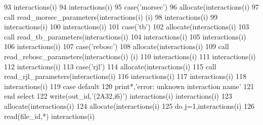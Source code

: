 \begin{DoxyCode}
{{{{{93             interactions(i)%
94             interactions(i)%
95         \textcolor{keywordflow}{case}(\textcolor{stringliteral}{'morsec'})
96             \textcolor{keyword}{allocate}(interactions(i)%
97             \textcolor{keyword}{call }read\_morsec\_parameters(interactions(i)%
      (i)%
98             interactions(i)%
99             interactions(i)%
100             interactions(i)%
101         \textcolor{keywordflow}{case}(\textcolor{stringliteral}{'tb'})
102             \textcolor{keyword}{allocate}(interactions(i)%
103             \textcolor{keyword}{call }read\_tb\_parameters(interactions(i)%
104             interactions(i)%
105             interactions(i)%
106             interactions(i)%
107         \textcolor{keywordflow}{case}(\textcolor{stringliteral}{'rebosc'})
108             \textcolor{keyword}{allocate}(interactions(i)%
109             \textcolor{keyword}{call }read\_rebosc\_parameters(interactions(i)%
      (i)%
110             interactions(i)%
111             interactions(i)%
112             interactions(i)%
113         \textcolor{keywordflow}{case}(\textcolor{stringliteral}{'rjl'})
114             \textcolor{keyword}{allocate}(interactions(i)%
115             \textcolor{keyword}{call }read\_rjl\_parameters(interactions(i)%
116             interactions(i)%
117             interactions(i)%
118             interactions(i)%
119 \textcolor{keywordflow}{        case default}
120             print*,\textcolor{stringliteral}{'error: unknown interaction name'}
121 \textcolor{keywordflow}{        end select}
122         \textcolor{keyword}{write}(out\_id,\textcolor{stringliteral}{'(2A32,i6)'}) interactions(i)%
      interactions(i)%
123         \textcolor{keyword}{allocate}(interactions(i)%
124         \textcolor{keyword}{allocate}(interactions(i)%
125         \textcolor{keywordflow}{do} j=1,interactions(i)%
126             \textcolor{keyword}{read}(file\_id,*) interactions(i)%
}}}}}
\end{DoxyCode}
